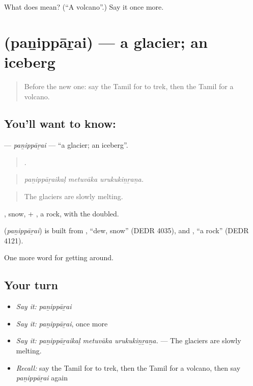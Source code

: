 \begin{tcolorbox}[breakable,colback=teal!4,colframe=teal!35!black,title={Before you move on}]
What does  mean? (\textquotedblleft{}A volcano\textquotedblright{}.) Say it once more.
\end{tcolorbox}
\section[\texorpdfstring{\ta{பனிப்பாறை} (paṉippāṟai)}{பனிப்பாறை (paṉippāṟai)}]{ (paṉippāṟai) — a glacier; an iceberg}

\label{lesson:TA-C433-panipparai}



\begin{quote}
Before the new one: say the Tamil for to trek, then the Tamil for a volcano.
\end{quote}

\subsection*{You'll want to know: }
\textbf{} — \emph{paṉippāṟai} — \textquotedblleft{}a glacier; an iceberg\textquotedblright{}.

\begin{quote}
  .
\end{quote}

\begin{quote}
\emph{paṉippāṟaikaḷ metuvāka urukukiṉṟaṉa.}
\end{quote}

\begin{quote}
The glaciers are slowly melting.
\end{quote}

, snow, + , a rock, with the  doubled.

\begin{cousinweb}
\textbf{} (\emph{paṉippāṟai}) is built from , \textquotedblleft{}dew, snow\textquotedblright{} (DEDR 4035), and , \textquotedblleft{}a rock\textquotedblright{} (DEDR 4121).
\end{cousinweb}

\begin{grammarlens}[title={What you've built}]
One more word for getting around.
\end{grammarlens}

\subsection*{Your turn}
\begin{itemize}
\raggedright
  \item \emph{Say it:} \emph{paṉippāṟai}
  \item \emph{Say it:} \emph{paṉippāṟai}, once more
  \item \emph{Say it:} \emph{paṉippāṟaikaḷ metuvāka urukukiṉṟaṉa.} — The glaciers are slowly melting.
  \item \emph{Recall:} say the Tamil for to trek, then the Tamil for a volcano, then say \emph{paṉippāṟai} again
\end{itemize}

